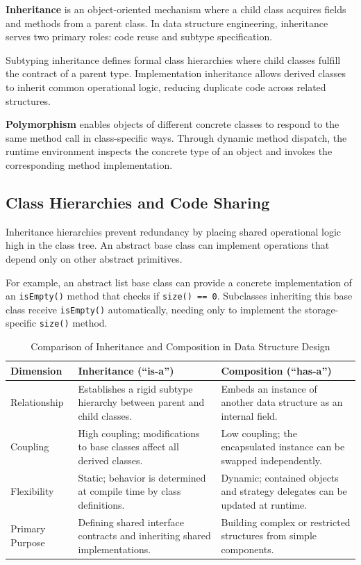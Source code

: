 \documentclass[12pt]{report}
\begin{document}
\textbf{Inheritance} is an object-oriented mechanism where a child class acquires fields and methods from a parent class. In data structure engineering, inheritance serves two primary roles: code reuse and subtype specification.

Subtyping inheritance defines formal class hierarchies where child classes fulfill the contract of a parent type. Implementation inheritance allows derived classes to inherit common operational logic, reducing duplicate code across related structures.

\textbf{Polymorphism} enables objects of different concrete classes to respond to the same method call in class-specific ways. Through dynamic method dispatch, the runtime environment inspects the concrete type of an object and invokes the corresponding method implementation.

\subsection{Class Hierarchies and Code Sharing}

Inheritance hierarchies prevent redundancy by placing shared operational logic high in the class tree. An abstract base class can implement operations that depend only on other abstract primitives.

For example, an abstract list base class can provide a concrete implementation of an \texttt{isEmpty()} method that checks if \texttt{size() == 0}. Subclasses inheriting this base class receive \texttt{isEmpty()} automatically, needing only to implement the storage-specific \texttt{size()} method.

\begin{table}[htbp]
\centering
\caption{Comparison of Inheritance and Composition in Data Structure Design}
\label{tab:inheritance_vs_composition}
\begin{tabularx}{\textwidth}{>{\raggedright\arraybackslash}p{2.5cm} X X}
\toprule
\textbf{Dimension} & \textbf{Inheritance (``is-a'')} & \textbf{Composition (``has-a'')} \\
\midrule
Relationship & Establishes a rigid subtype hierarchy between parent and child classes. & Embeds an instance of another data structure as an internal field. \\
Coupling & High coupling; modifications to base classes affect all derived classes. & Low coupling; the encapsulated instance can be swapped independently. \\
Flexibility & Static; behavior is determined at compile time by class definitions. & Dynamic; contained objects and strategy delegates can be updated at runtime. \\
Primary Purpose & Defining shared interface contracts and inheriting shared implementations. & Building complex or restricted structures from simple components. \\
\bottomrule
\end{tabularx}
\end{table}
\end{document}
